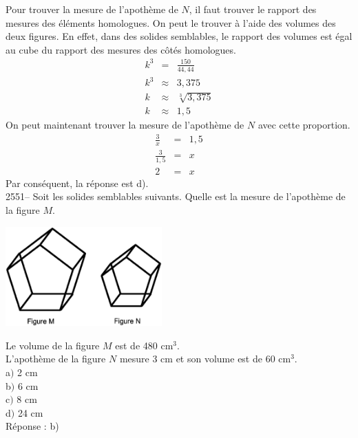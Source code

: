 \documentclass[letterpaper, 12pt]{article}
\begin{document}
Pour trouver la mesure de l'apoth\`eme de $N$, il faut trouver le rapport des mesures des \'el\'ements homologues. On peut le trouver \`a l'aide des volumes des deux figures. En effet, dans des solides semblables, le rapport des volumes est \'egal au cube du rapport des mesures des c\^ot\'es homologues.
\begin{eqnarray*}
k^{3}&=&\frac{150}{44,44}\\[2mm]
k^{3}&\approx&3,375\\
k&\approx&\sqrt[3]{3,375}\\
k&\approx&1,5
\end{eqnarray*}
On peut maintenant trouver la mesure de l'apoth\`eme de $N$ avec cette proportion.
\begin{eqnarray*}
 \frac{3}{x}&=&1,5\\[2mm]
\frac{3}{1,5}&=&x\\[2mm]
2&=&x
\end{eqnarray*}
Par cons\'equent, la r\'eponse est d).\\


2551-- Soit les solides semblables suivants. Quelle est la mesure de l'apoth\`eme de la figure $M$.\\
\begin{center}
 \includegraphics[width=6cm,bb=14 14 588 376]{Q2550.eps}
\end{center}
Le volume de la figure $M$ est de 480 cm$^{3}$.\\
L'apoth\`eme de la figure $N$ mesure 3 cm et son volume est de 60 cm$^{3}$.\\

a$)$  2 cm \\
b$)$  6 cm \\
c$)$  8 cm \\
d$)$  24 cm\\

R\'eponse : b)\\
\end{document}
